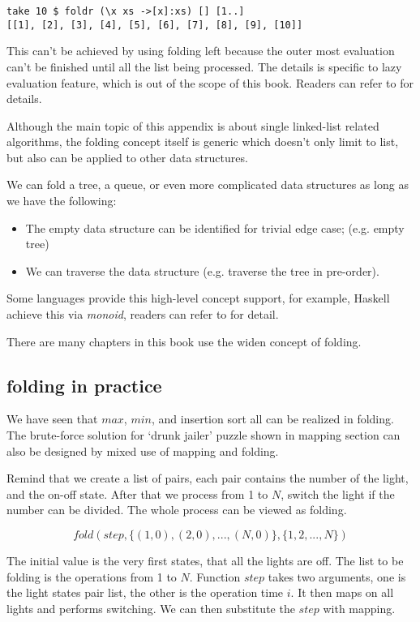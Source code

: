 \documentclass{article}
\begin{document}
\lstset{language=Haskell}
\begin{lstlisting}
take 10 $ foldr (\x xs ->[x]:xs) [] [1..]
[[1], [2], [3], [4], [5], [6], [7], [8], [9], [10]]
\end{lstlisting} %

This can't be achieved by using folding left because the outer most evaluation can't be finished until
all the list being processed. The details is specific to lazy evaluation feature, which is out of the 
scope of this book. Readers can refer to \cite{Haskell-wiki} for details.

Although the main topic of this appendix is about single linked-list related algorithms, the folding
concept itself is generic which doesn't only limit to list, but also can be applied to other data structures.

We can fold a tree, a queue, or even more complicated data structures as long as we have the following:

\begin{itemize}
\item The empty data structure can be identified for trivial edge case; (e.g. empty tree)
\item We can traverse the data structure (e.g. traverse the tree in pre-order).
\end{itemize}

Some languages provide this high-level concept support, for example, Haskell achieve this via
{\em monoid}, readers can refer to \cite{learn-haskell} for detail.

There are many chapters in this book use the widen concept of folding.

\subsection{folding in practice}

We have seen that $max$, $min$, and insertion sort all can be realized in folding. The 
brute-force solution for `drunk jailer' puzzle shown in mapping section can also be
designed by mixed use of mapping and folding.

Remind that we create a list of pairs, each pair contains the number of the light, and 
the on-off state. After that we process from 1 to $N$, switch the light if the number
can be divided. The whole process can be viewed as folding.

\[
fold(step, \{(1, 0), (2, 0), ..., (N, 0) \}, \{1, 2, ..., N\})
\]

The initial value is the very first states, that all the lights are off. The list to be
folding is the operations from 1 to $N$. Function $step$ takes two arguments, one is
the light states pair list, the other is the operation time $i$. It then maps
on all lights and performs switching. We can then substitute the $step$ with mapping.
\end{document}
